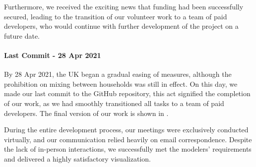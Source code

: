 Furthermore, we received the exciting news that funding had been successfully secured, leading to the transition of our volunteer work to a team of paid developers, who would continue with further development of the project on a future date.

\paragraph{Last Commit - 28 Apr 2021}
By 28 Apr 2021, the UK began a gradual easing of measures, although the prohibition on mixing between households was still in effect.
On this day, we made our last commit to the GitHub repository, this act signified the completion of our work, as we had smoothly transitioned all tasks to a team of paid developers.
The final version of our work is shown in .

During the entire development process, our meetings were exclusively conducted virtually, and our communication relied heavily on email correspondence.
Despite the lack of in-person interactions, we successfully met the modelers' requirements and delivered a highly satisfactory visualization.
